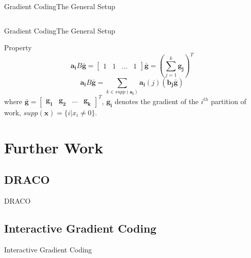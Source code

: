 \documentclass{beamer}
\begin{document}
\begin{frame}{Gradient Coding}{The General Setup}
\begin{columns}
\begin{column}{.5\linewidth}
\end{column}

\end{columns}

\end{frame}

\begin{frame}{Gradient Coding}{The General Setup}

\begin{block}{Property}
    \[\boldsymbol{a_i}B\boldsymbol{\bar{g}} = \begin{bmatrix}
        1 & 1 & \dots & 1
    \end{bmatrix}\boldsymbol{\bar{g}} = (\sum_{j=1}^{k}\boldsymbol{g_j})^T\]
    \[\boldsymbol{a_i}B\boldsymbol{\bar{g}} = \sum_{k\in supp(\boldsymbol{a_i})}\boldsymbol{a_i}(j)(\boldsymbol{b_j} \boldsymbol{\bar{g}})\]
    where $\boldsymbol{\bar{g}} = \begin{bmatrix}
        \boldsymbol{g_1} & \boldsymbol{g_2} & \dots & \boldsymbol{g_k}
    \end{bmatrix}^T$, $\boldsymbol{g_i}$ denotes the gradient of the $i^{th}$ partition of work, $supp(\boldsymbol{x}) = \{i | x_i \neq 0\}$.
\end{block}


\end{frame}

\section{Further Work}

\subsection{DRACO}

\begin{frame}{DRACO}

\end{frame}

\subsection{Interactive Gradient Coding}

\begin{frame}{Interactive Gradient Coding}

\end{frame}
\end{document}
